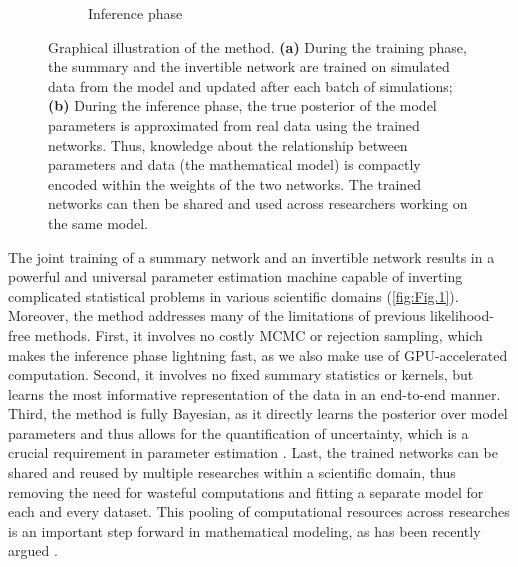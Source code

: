 \documentclass[9pt,twoside,lineno]{pnas-new}
\begin{document}
\begin{figure}
\begin{subfigure}[b]{0.49\textwidth}
    \caption{Inference phase}
    \label{fig:Fig.1b}
  \end{subfigure}
      \caption{Graphical illustration of the method. \textbf{(a)} During the training phase, the summary and the invertible network are trained on simulated data from the model and updated after each batch of simulations; \textbf{(b)} During the inference phase, the true posterior of the model parameters is approximated from real data using the trained networks. Thus, knowledge about the relationship between parameters and data (the mathematical model) is compactly encoded within the weights of the two networks. The trained networks can then be shared and used across researchers working on the same model.} \label{fig:Fig.1}
\end{figure}
The joint training of a summary network and an invertible network results in a powerful and universal parameter estimation machine capable of inverting complicated statistical problems in various scientific domains (\autoref{fig:Fig.1}). Moreover, the method addresses many of the limitations of previous likelihood-free methods. First, it involves no costly MCMC or rejection sampling, which makes the inference phase lightning fast, as we also make use of GPU-accelerated computation. Second, it involves no fixed summary statistics or kernels, but learns the most informative representation of the data in an end-to-end manner. Third, the method is fully Bayesian, as it directly learns the posterior over model parameters and thus allows for the quantification of uncertainty, which is a crucial requirement in parameter estimation \cite{kendall2017uncertainties, gelman2013bayesian}. Last, the trained networks can be shared and reused by multiple researches within a scientific domain, thus removing the need for wasteful computations and fitting a separate model for each and every dataset. This pooling of computational resources across researches is an important step forward in mathematical modeling, as has been recently argued \cite{mestdagh2018prepaid}.
\end{document}
